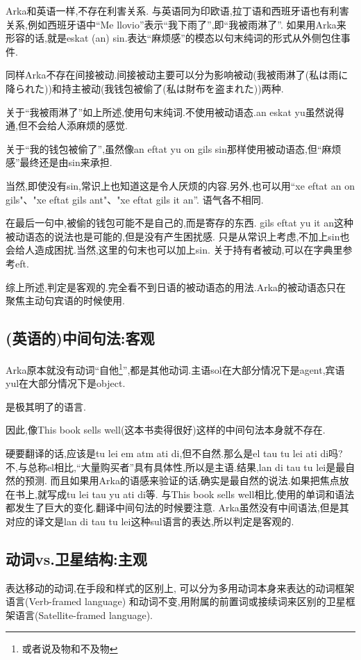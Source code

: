 Arka和英语一样,不存在利害关系.
与英语同为印欧语,拉丁语和西班牙语也有利害关系,例如西班牙语中“Me llovio”表示“我下雨了”,即“我被雨淋了”.
如果用Arka来形容的话,就是eskat (an) sin.表达``麻烦感''的模态以句末纯词的形式从外侧包住事件.

同样Arka不存在间接被动.间接被动主要可以分为影响被动(我被雨淋了(私は雨に降られた))和持主被动(我钱包被偷了(私は財布を盗まれた))两种.

关于“我被雨淋了”如上所述,使用句末纯词.不使用被动语态.an eskat yu虽然说得通,但不会给人添麻烦的感觉.

关于“我的钱包被偷了”,虽然像an eftat yu on gils sin那样使用被动语态,但``麻烦感''最终还是由sin来承担.

当然,即使没有sin,常识上也知道这是令人厌烦的内容.另外,也可以用``xe eftat an on gils"、"xe eftat gils ant"、"xe eftat gils it an''.
语气各不相同.

在最后一句中,被偷的钱包可能不是自己的,而是寄存的东西.
gils eftat yu it an这种被动语态的说法也是可能的,但是没有产生困扰感.
只是从常识上考虑,不加上sin也会给人造成困扰.当然,这里的句末也可以加上sin.
关于持有者被动,可以在字典里参考eft.

综上所述,判定是客观的.完全看不到日语的被动语态的用法.Arka的被动语态只在聚焦主动句宾语的时候使用.

\subsection{(英语的)中间句法:客观}

Arka原本就没有动词“自他\footnote{或者说及物和不及物}”,都是其他动词.主语sol在大部分情况下是agent,宾语yul在大部分情况下是object.

是极其明了的语言.

因此,像This book sells well(这本书卖得很好)这样的中间句法本身就不存在.

硬要翻译的话,应该是tu lei em atm ati di,但不自然.那么是el tau tu lei ati di吗?
不,与总称el相比,“大量购买者”具有具体性,所以是主语.结果,lan di tau tu lei是最自然的预测.
而且如果用Arka的语感来验证的话,确实是最自然的说法.如果把焦点放在书上,就写成tu lei tau yu ati di等.
与This book sells well相比,使用的单词和语法都发生了巨大的变化.翻译中间句法的时候要注意.
Arka虽然没有中间语法,但是其对应的译文是lan di tau tu lei这种sul语言的表达,所以判定是客观的.

\subsection{动词vs.卫星结构:主观}
表达移动的动词,在手段和样式的区别上,
可以分为多用动词本身来表达的动词框架语言(Verb-framed language)
和动词不变,用附属的前置词或接续词来区别的卫星框架语言(Satellite-framed language).

